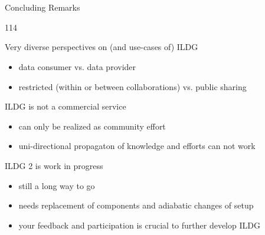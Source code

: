\documentclass[aspectratio=169,xcolor=dvipsnames]{beamer}
\newcommand{\bi}{\begin{itemize}}
\newcommand{\ei}{\end{itemize}}
\begin{document}
\section{}
\begin{frame}{Concluding Remarks}

  \begin{dinglist}{114}

  \item Very diverse perspectives on (and use-cases of) ILDG
    \bi
    \item data consumer vs. data provider
    \item restricted (within or between collaborations) vs. public sharing
    \ei
  \item ILDG is \alert{not} a commercial service
    \bi
    \item can only be realized as community effort
    \item uni-directional propagaton of knowledge and efforts can not work
    \ei
 
  \item ILDG 2 is work in progress
    \bi
    \item still a long way to go
    \item needs replacement of components and adiabatic changes of setup
    \item your feedback and participation is crucial to further develop ILDG
    \ei
  \end{dinglist}
    
\end{frame}
\end{document}

